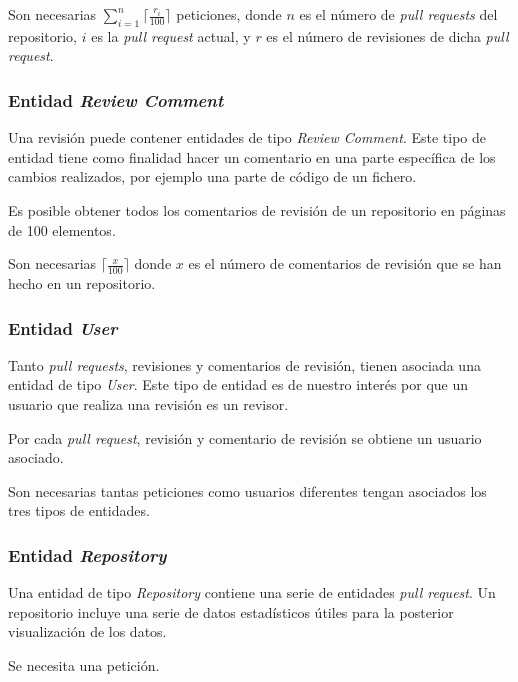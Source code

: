 
Son necesarias $\sum_{i=1}^{n}\lceil\frac{r_{i}}{100}\rceil$ peticiones, donde $n$ es el número de \emph{pull requests} del repositorio, $i$ es la \emph{pull request} actual, y $r$ es el número de revisiones de dicha \emph{pull request}.

\subsubsection{Entidad \emph{Review Comment}}

Una revisión puede contener entidades de tipo \emph{Review Comment}. Este tipo de entidad tiene como finalidad hacer un comentario en una parte específica de los cambios realizados, por ejemplo una parte de código de un fichero.

Es posible obtener todos los comentarios de revisión de un repositorio en páginas de 100 elementos.


Son necesarias $\lceil\frac{x}{100}\rceil$ donde $x$ es el número de comentarios de revisión que se han hecho en un repositorio.

\subsubsection{Entidad \emph{User}}

Tanto \emph{pull requests}, revisiones y comentarios de revisión, tienen asociada una entidad de tipo \emph{User}. Este tipo de entidad es de nuestro interés por que un usuario que realiza una revisión es un revisor.

Por cada \emph{pull request}, revisión y comentario de revisión se obtiene un usuario asociado.

Son necesarias tantas peticiones como usuarios diferentes tengan asociados los tres tipos de entidades.

\subsubsection{Entidad \emph{Repository}}

Una entidad de tipo \emph{Repository} contiene una serie de entidades \emph{pull request}. Un repositorio incluye una serie de datos estadísticos útiles para la posterior visualización de los datos.

Se necesita una petición.


